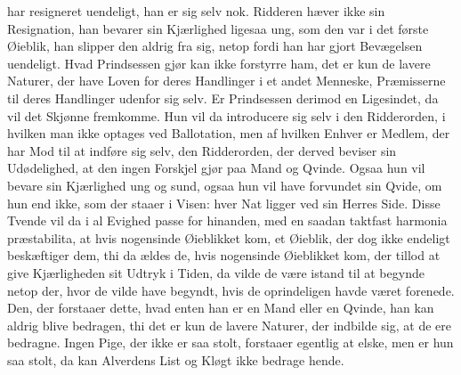 \documentclass[12pt,a4paper]{article}
\begin{document}
har resigneret uendeligt, han er sig selv nok. Ridderen hæver ikke sin Resignation, han bevarer sin Kjærlighed ligesaa ung, som den var i det første Øieblik, han slipper den aldrig fra sig, netop fordi han har gjort Bevægelsen uendeligt. Hvad Prindsessen gjør kan ikke forstyrre ham, det er kun de lavere Naturer, der have Loven for deres Handlinger i et andet Menneske, Præmisserne til deres Handlinger udenfor sig selv. Er Prindsessen derimod en Ligesindet, da vil det Skjønne fremkomme. Hun vil da introducere sig selv i den Ridderorden, i hvilken man ikke optages ved Ballotation, men af hvilken Enhver er Medlem, der har Mod til at indføre sig selv, den Ridderorden, der derved beviser sin Udødelighed, at den ingen Forskjel gjør paa Mand og Qvinde. Ogsaa hun vil bevare sin Kjærlighed ung og sund, ogsaa hun vil have forvundet sin Qvide, om hun end ikke, som der staaer i Visen: hver Nat ligger ved sin Herres Side. Disse Tvende vil da i al Evighed passe for hinanden, med en saadan taktfast harmonia præstabilita, at hvis nogensinde Øieblikket kom, et Øieblik, der dog ikke endeligt beskæftiger dem, thi da ældes de, hvis nogensinde Øieblikket kom, der tillod at give Kjærligheden sit Udtryk i Tiden, da vilde de være istand til at begynde netop der, hvor de vilde have begyndt, hvis de oprindeligen havde været forenede. Den, der forstaaer dette, hvad enten han er en Mand eller en Qvinde, han kan aldrig blive bedragen, thi det er kun de lavere Naturer, der indbilde sig, at de ere bedragne. Ingen Pige, der ikke er saa stolt, forstaaer egentlig at elske, men er hun saa stolt, da kan Alverdens List og Kløgt ikke bedrage hende.
\end{document}
